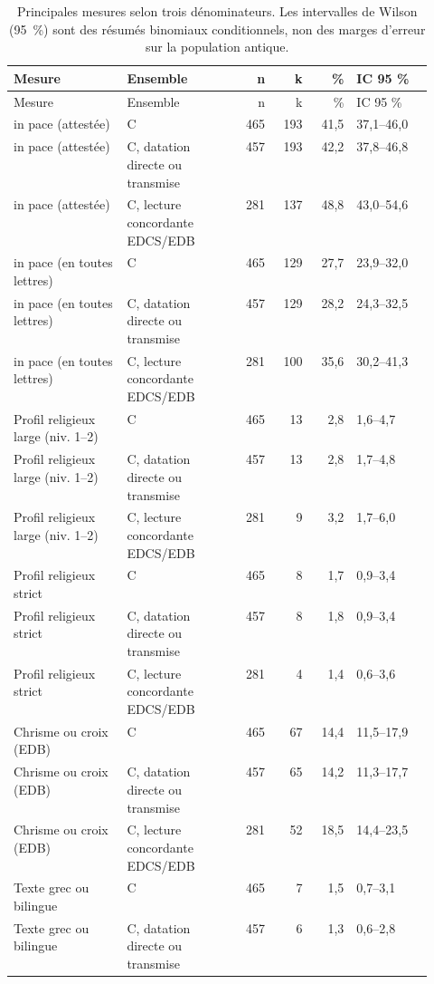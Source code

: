 \begin{longtable}{@{}p{0.27\linewidth} p{0.27\linewidth} r r r l@{}}\caption{Principales mesures selon trois dénominateurs. Les intervalles de Wilson (95~\%) sont des résumés binomiaux conditionnels, non des marges d’erreur sur la population antique.}\label{tab:mesures}\\
\toprule Mesure & Ensemble & n & k & \% & IC 95 \%\\\midrule\endfirsthead\toprule Mesure & Ensemble & n & k & \% & IC 95 \%\\\midrule\endhead\bottomrule\endfoot
in pace (attestée) & C & 465 & 193 & 41,5 & 37,1–46,0 \\
in pace (attestée) & C, datation directe ou transmise & 457 & 193 & 42,2 & 37,8–46,8 \\
in pace (attestée) & C, lecture concordante EDCS/EDB & 281 & 137 & 48,8 & 43,0–54,6 \\
in pace (en toutes lettres) & C & 465 & 129 & 27,7 & 23,9–32,0 \\
in pace (en toutes lettres) & C, datation directe ou transmise & 457 & 129 & 28,2 & 24,3–32,5 \\
in pace (en toutes lettres) & C, lecture concordante EDCS/EDB & 281 & 100 & 35,6 & 30,2–41,3 \\
Profil religieux large (niv. 1–2) & C & 465 & 13 & 2,8 & 1,6–4,7 \\
Profil religieux large (niv. 1–2) & C, datation directe ou transmise & 457 & 13 & 2,8 & 1,7–4,8 \\
Profil religieux large (niv. 1–2) & C, lecture concordante EDCS/EDB & 281 & 9 & 3,2 & 1,7–6,0 \\
Profil religieux strict & C & 465 & 8 & 1,7 & 0,9–3,4 \\
Profil religieux strict & C, datation directe ou transmise & 457 & 8 & 1,8 & 0,9–3,4 \\
Profil religieux strict & C, lecture concordante EDCS/EDB & 281 & 4 & 1,4 & 0,6–3,6 \\
Chrisme ou croix (EDB) & C & 465 & 67 & 14,4 & 11,5–17,9 \\
Chrisme ou croix (EDB) & C, datation directe ou transmise & 457 & 65 & 14,2 & 11,3–17,7 \\
Chrisme ou croix (EDB) & C, lecture concordante EDCS/EDB & 281 & 52 & 18,5 & 14,4–23,5 \\
Texte grec ou bilingue & C & 465 & 7 & 1,5 & 0,7–3,1 \\
Texte grec ou bilingue & C, datation directe ou transmise & 457 & 6 & 1,3 & 0,6–2,8 \\

\end{longtable}
